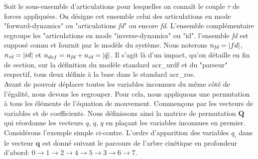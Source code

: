 \documentclass{report}
\begin{document}
Soit le sous-ensemble d'articulations pour lesquelles on connaît le couple $\tau$ de forces appliquées. On désigne cet ensemble celui des articulations en mode "forward-dynamics" ou "articulations \emph{fd}" ou encore \emph{fd}. L'ensemble complémentaire regroupe les "articulations en mode "inverse-dynamics" ou "id". l'ensemble \emph{fd} est supposé connu et fournit par le modèle du système. Nous noterons $n_{\emph{fd}}=\vert fd \vert$, $n_{\emph{id}}=\vert id \vert$ et $n_{dof}=n_{\emph{fd}}+n_{\emph{id}}=\vert \ddot{q} \vert$. Il s'agit là d'un impact, qu'on détaille en fin de section, sur la définition du modèle standard \gls{acr_urdf} et du "parseur" respectif, tous deux définis à la base dans le standard \gls{acr_ros}.\\
Avant de pouvoir déplacer toutes les variables inconnues du même côté de l'égalité, nous devons les regrouper. Pour cela, nous appliquons une permutation à tous les éléments de l'équation de mouvement. Commençons par les vecteurs de variables et de coefficients. Nous définissons ainsi la matrice de permutation $\mathbf{Q}$ qui réordonne les vecteurs $q$, $\dot{q}$, $\ddot{q}$ en plaçant les variables inconnues en premier. Considérons l'exemple simple ci-contre. L'ordre d'apparition des variables $q_i$ dans le vecteur $\mathbf{q}$ est donné suivant le parcours de l'arbre cinétique en profondeur d'abord: $0\longrightarrow 1\longrightarrow 2\longrightarrow 4\longrightarrow 5\longrightarrow 3\longrightarrow 6\longrightarrow 7.$
\end{document}
